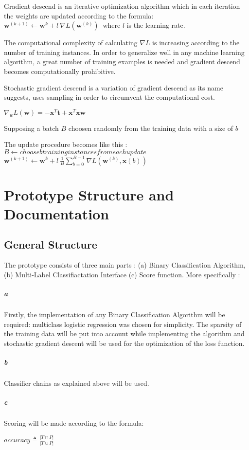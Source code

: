 \documentclass[10pt,letterpaper]{article}
\begin{document}
	 Gradient descend is an iterative optimization algorithm which in each iteration the weights are updated according to the formula:
	 $\textbf{w}^{(k+1)} \leftarrow \textbf{w}^{k} + l\ \nabla L(\textbf{w}^{(k)}) \ $ where $l$ is the learning rate. 
	 
	 The computational complexity of calculating $\nabla L$ is increasing according to the number of training instances. In order to generalize well in any machine learning algorithm, a great number of training examples is needed and gradient descend becomes computationally prohibitive.
	 
	 Stochastic gradient descend is a variation of gradient descend as its name suggests, uses sampling in order to circumvent the computational cost.
	 
	 
	 $\nabla_{w} L(\textbf{w}) = - \textbf{x}^{T}\textbf{t}+\textbf{x}^{T}\textbf{x}\textbf{w} $
	 
	 Supposing a batch $B$ choosen randomly from the training data with a size of $b$
	 
	 The update procedure becomes like this : 
	 $B \leftarrow choose b training instances from each update$
	 $\textbf{w}^{(k+1)} \leftarrow \textbf{w}^{k} + l\ \frac{1}{B} \sum_{b=0}^{B-1} \nabla L(\textbf{w}^{(k)},\textbf{x}(b)) \ $
	 
	\section*{Prototype Structure and Documentation}
	\subsection*{General Structure}
	The prototype consists of three main parts : (a) Binary Classification Algorithm, (b) Multi-Label Classifiactation Interface (c) Score function.  More specifically :

	\subparagraph{a}Firstly, the implementation of any Binary Classification Algorithm will be required: multiclass logistic regression was chosen for simplicity. 
	The sparsity of the training data will be put into account while implementing the algorithm and stochastic gradient descent will be used for the optimization of the loss function.
	
	\subparagraph{b}Classifier chains as explained above will be used.
	
	\subparagraph{c}Scoring will be made according to the formula:
	\begin{center}
		$accuracy \triangleq \frac{|T \cap P|}{|T \cup P |}$
	\end{center}
	
\end{document}
